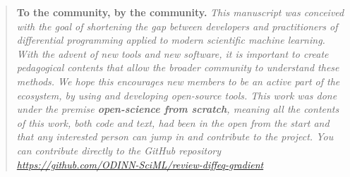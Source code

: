 
\begin{quote}
    \textbf{To the community, by the community.}
    \textit{This manuscript was conceived with the goal of shortening the gap between developers and practitioners of differential programming applied to  modern scientific machine learning. 
    With the advent of new tools and new software, it is important to create pedagogical contents that allow the broader community to understand these methods. 
    We hope this encourages new members to be an active part of the ecosystem, by using and developing open-source tools. 
    This work was done under the premise \textbf{open-science from scratch}, meaning all the contents of this work, both code and text, had been in the open from the start and that any interested person can jump in and contribute to the project. 
    You can contribute directly to the GitHub repository \url{https://github.com/ODINN-SciML/review-diffeq-gradient}
    }
\end{quote}